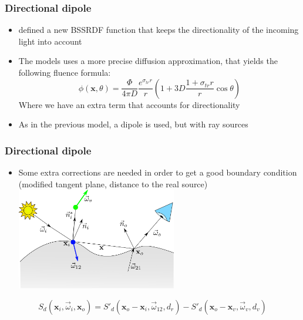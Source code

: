 \documentclass{beamer}
\newcommand{\vomega}{\vec{\omega}}
\newcommand{\x}{\mathbf{x}}
\begin{document}
\begin{frame}
    \frametitle{Directional dipole}
		\vspace{0.3cm}
			\begin{itemize}
				\item \citep{IMM2013-06646} defined a new BSSRDF function that keeps the directionality of the incoming light into account
				\item The models uses a more precise diffusion approximation, that yields the following fluence formula:
				\begin{equation*}
\phi(\x, \theta) = \frac{\Phi}{4\pi D} \frac{e^{\sigma_{tr} r}}{r} \left( 1 + 3D\frac{1 + \sigma_{tr} r}{r}\cos\theta\right)
\end{equation*}
			Where we have an extra term that accounts for directionality
			\item As in the previous model, a dipole is used, but with ray sources
	\end{itemize}
\end{frame}

\begin{frame}
    \frametitle{Directional dipole}
		\vspace{0.3cm}
			\begin{itemize}
				\item Some extra corrections are needed in order to get a good boundary condition \\(modified tangent plane, distance to the real source)	\\			
				\centering
				\vspace{0.2cm}
				\includegraphics[width=0.55\textwidth]{jeppe}
			\end{itemize}
			$$
			S_d(\x_i, \vomega_i, \x_o) = S'_d(\x_o - \x_i, \vomega_{12}, d_r) - S'_d(\x_o - \x_v, \vomega_{v}, d_v)
			$$
\end{frame}
\end{document}
